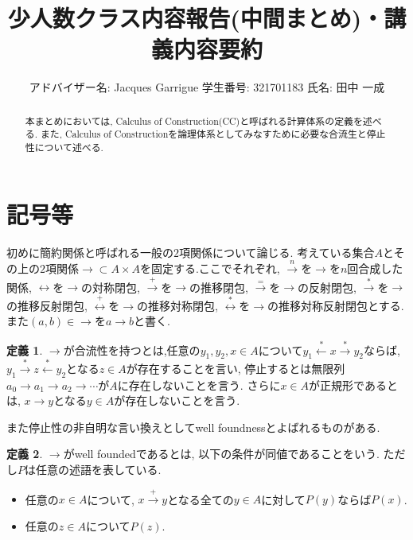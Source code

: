 \documentclass{ltjsarticle}
\begin{document}
\theoremstyle{definition}
\newtheorem{defn}{定義}
\newtheorem{thm}{定理}
\newtheorem{lem}{補題}
\newtheorem{ex}{例}

\title{少人数クラス内容報告(中間まとめ)・講義内容要約}
\author{
アドバイザー名: Jacques Garrigue
学生番号: 321701183
氏名: 田中 一成
}
\maketitle

\begin{abstract}
本まとめにおいては, Calculus of Construction(CC)と呼ばれる計算体系の定義を述べる. また, Calculus of Constructionを論理体系としてみなすために必要な合流生と停止性について述べる.
\end{abstract}

\section{記号等}
初めに簡約関係と呼ばれる一般の$2$項関係について論じる. 考えている集合$A$とその上の$2$項関係$\rightarrow \subset A \times A$を固定する.ここでそれぞれ,
$\xrightarrow{n}$を$\rightarrow$を$n$回合成した関係,
$\leftrightarrow$を$\rightarrow$の対称閉包,
$\xrightarrow{+}$を$\rightarrow$の推移閉包,
$\xrightarrow{=}$を$\rightarrow$の反射閉包,
$\overset{*}{\rightarrow}$を$\rightarrow$の推移反射閉包,
$\overset{+}{\leftrightarrow}$を$\rightarrow$の推移対称閉包,
$\overset{*}{\leftrightarrow}$を$\rightarrow$の推移対称反射閉包とする.
また$(a, b) \in \rightarrow$を$a \rightarrow b$と書く.

\begin{defn}
$\rightarrow$が合流性を持つとは,任意の$y_{1},y_{2},x \in A$について$y_1 \overset{*}{\leftarrow} x \overset{*}{\rightarrow} y_2$ならば, $y_1 \overset{*}{\rightarrow} z \overset{*}{\leftarrow} y_2$となる$z \in A$が存在することを言い, 停止するとは無限列$a_0 \rightarrow a_1 \rightarrow a_2 \rightarrow \cdots$が$A$に存在しないことを言う. さらに$x \in A$が正規形であるとは, $x \rightarrow y$となる$y \in A$が存在しないことを言う.
\end{defn}

また停止性の非自明な言い換えとしてwell foundnessとよばれるものがある.

\begin{defn}
$\rightarrow$がwell foundedであるとは, 以下の条件が同値であることをいう. ただし$P$は任意の述語を表している.
 \begin{itemize}
  \item 任意の$x \in A$について, $x \xrightarrow{+} y$となる全ての$y \in A$に対して$P(y)$ならば$P(x)$.
  \item 任意の$z \in A$について$P(z)$.
 \end{itemize}
\end{defn}
\end{document}
